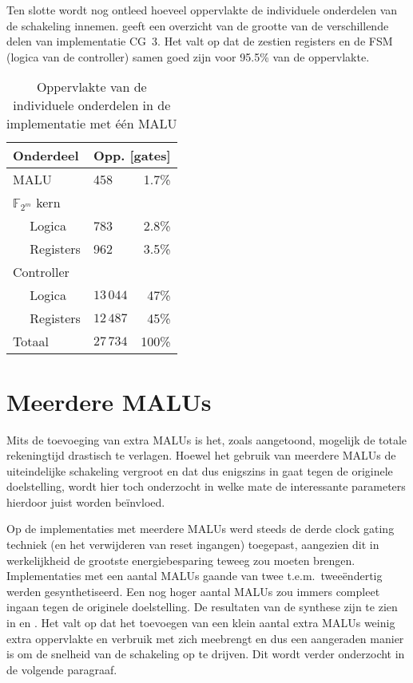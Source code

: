 Ten slotte wordt nog ontleed hoeveel oppervlakte de individuele onderdelen van de schakeling innemen.  geeft een overzicht van de grootte van de verschillende delen van implementatie CG~3. Het valt op dat de zestien registers en de FSM (logica van de controller) samen goed zijn voor 95.5\% van de oppervlakte.

\begin{table}[h]
	\caption{Oppervlakte van de individuele onderdelen in de implementatie met \'e\'en MALU}
	\label{tabel-resultaten-onderdelen}

	\centering
	\begin{tabular}{llr}
		\toprule
		Onderdeel					& \multicolumn{2}{c}{Opp. [gates]}\\
		\midrule
		MALU				 			& 458			& 1.7\%\\
		$\mathbb{F}_{2^m}$ kern	&				& \\
		$\quad$ Logica				& 783			& 2.8\%\\
		$\quad$ Registers			& 962			& 3.5\%\\
		Controller					&				& \\
		$\quad$ Logica				& $13\,044$	& 47\%\\
		$\quad$ Registers			& $12\,487$	& 45\%\\
		\midrule
		Totaal						& $27\,734$	& 100\%\\
		\bottomrule		
	\end{tabular}
\end{table}


\section{Meerdere MALUs\label{sectie-resulaten-malus}}

Mits de toevoeging van extra MALUs is het, zoals aangetoond, mogelijk de totale rekeningtijd drastisch te verlagen. Hoewel het gebruik van meerdere MALUs de uiteindelijke schakeling vergroot en dat dus enigszins in gaat tegen de originele doelstelling, wordt hier toch onderzocht in welke mate de interessante parameters hierdoor juist worden be\"invloed.

Op de implementaties met meerdere MALUs werd steeds de derde clock gating techniek (en het verwijderen van reset ingangen) toegepast, aangezien dit in werkelijkheid de grootste energiebesparing teweeg zou moeten brengen. Implementaties met een aantal MALUs gaande van twee t.e.m.\ twee\"endertig werden gesynthetiseerd. Een nog hoger aantal MALUs zou immers compleet ingaan tegen de originele doelstelling. De resultaten van de synthese zijn te zien in  en . Het valt op dat het toevoegen van een klein aantal extra MALUs weinig extra oppervlakte en verbruik met zich meebrengt en dus een aangeraden manier is om de snelheid van de schakeling op te drijven. Dit wordt verder onderzocht in de volgende paragraaf.

